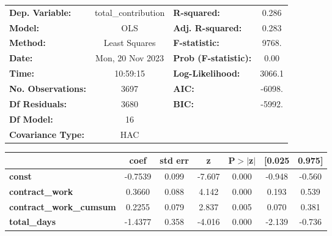 \begin{center}
\begin{tabular}{lclc}
\toprule
\textbf{Dep. Variable:}                  & total\_contribution & \textbf{  R-squared:         } &     0.286   \\
\textbf{Model:}                          &         OLS         & \textbf{  Adj. R-squared:    } &     0.283   \\
\textbf{Method:}                         &    Least Squares    & \textbf{  F-statistic:       } &     9768.   \\
\textbf{Date:}                           &   Mon, 20 Nov 2023  & \textbf{  Prob (F-statistic):} &     0.00    \\
\textbf{Time:}                           &       10:59:15      & \textbf{  Log-Likelihood:    } &    3066.1   \\
\textbf{No. Observations:}               &          3697       & \textbf{  AIC:               } &    -6098.   \\
\textbf{Df Residuals:}                   &          3680       & \textbf{  BIC:               } &    -5992.   \\
\textbf{Df Model:}                       &            16       & \textbf{                     } &             \\
\textbf{Covariance Type:}                &         HAC         & \textbf{                     } &             \\
\bottomrule
\end{tabular}
\begin{tabular}{lcccccc}
                                         & \textbf{coef} & \textbf{std err} & \textbf{z} & \textbf{P$> |$z$|$} & \textbf{[0.025} & \textbf{0.975]}  \\
\midrule
\textbf{const}                           &      -0.7539  &        0.099     &    -7.607  &         0.000        &       -0.948    &       -0.560     \\
\textbf{contract\_work}                  &       0.3660  &        0.088     &     4.142  &         0.000        &        0.193    &        0.539     \\
\textbf{contract\_work\_cumsum}          &       0.2255  &        0.079     &     2.837  &         0.005        &        0.070    &        0.381     \\
\textbf{total\_days}                     &      -1.4377  &        0.358     &    -4.016  &         0.000        &       -2.139    &       -0.736     \\

\end{tabular}
\end{center}
